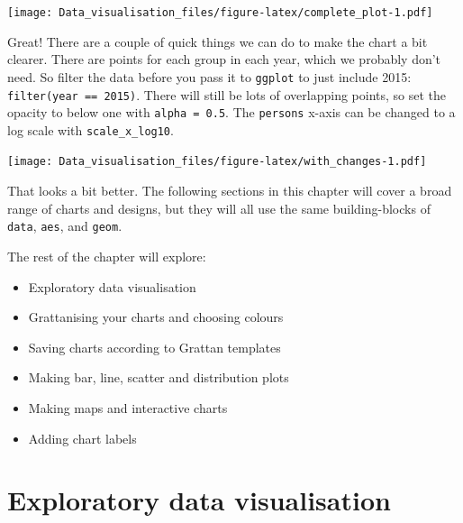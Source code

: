 \documentclass[]{book}
\newenvironment{Shaded}{\begin{snugshade}}{\end{snugshade}}
\newcommand{\DataTypeTok}[1]{\textcolor[rgb]{0.13,0.29,0.53}{#1}}
\newcommand{\FloatTok}[1]{\textcolor[rgb]{0.00,0.00,0.81}{#1}}
\newcommand{\KeywordTok}[1]{\textcolor[rgb]{0.13,0.29,0.53}{\textbf{#1}}}
\newcommand{\NormalTok}[1]{#1}
\newcommand{\OperatorTok}[1]{\textcolor[rgb]{0.81,0.36,0.00}{\textbf{#1}}}
\newcommand{\StringTok}[1]{\textcolor[rgb]{0.31,0.60,0.02}{#1}}
\providecommand{\tightlist}{%
  \setlength{\itemsep}{0pt}\setlength{\parskip}{0pt}}
\begin{document}
\texttt{[image: Data\_visualisation\_files/figure-latex/complete\_plot-1.pdf]}

Great! There are a couple of quick things we can do to make the chart a bit clearer. There are points for each group in each year, which we probably don't need. So filter the data before you pass it to \texttt{ggplot} to just include 2015: \texttt{filter(year\ ==\ 2015)}. There will still be lots of overlapping points, so set the opacity to below one with \texttt{alpha\ =\ 0.5}. The \texttt{persons} x-axis can be changed to a log scale with \texttt{scale\_x\_log10}.

\begin{Shaded}
\end{Shaded}

\texttt{[image: Data\_visualisation\_files/figure-latex/with\_changes-1.pdf]}

That looks a bit better. The following sections in this chapter will cover a broad range of charts and designs, but they will all use the same building-blocks of \texttt{data}, \texttt{aes}, and \texttt{geom}.

The rest of the chapter will explore:

\begin{itemize}
\tightlist
\item
  Exploratory data visualisation
\item
  Grattanising your charts and choosing colours
\item
  Saving charts according to Grattan templates
\item
  Making bar, line, scatter and distribution plots
\item
  Making maps and interactive charts
\item
  Adding chart labels
\end{itemize}

\hypertarget{exploratory-data-visualisation}{%
\section{Exploratory data visualisation}\label{exploratory-data-visualisation}}
\end{document}
